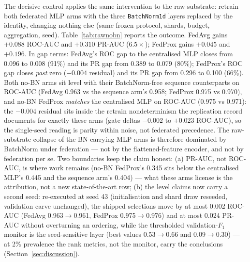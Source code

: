 The decisive control applies the same intervention to the raw
substrate: retrain both federated MLP arms with the three
\texttt{BatchNorm1d} layers replaced by the identity, changing
nothing else (same frozen protocol, shards, budget, aggregation,
seed). Table~\ref{tab:rawnobn} reports the outcome. FedAvg gains
$+0.088$ ROC-AUC and $+0.310$ PR-AUC ($6.5\times$); FedProx gains
$+0.045$ and $+0.196$. In gap terms: FedAvg's ROC gap to the
centralised MLP closes from 0.096 to 0.008 (91\%) and its PR gap
from 0.389 to 0.079 (80\%); FedProx's ROC gap closes \emph{past}
zero ($-0.004$ residual) and its PR gap from 0.296 to 0.100 (66\%).
Both no-BN arms sit level with their BatchNorm-free sequence
counterparts on ROC-AUC (FedAvg 0.963 vs the sequence arm's 0.958;
FedProx 0.975 vs 0.970), and no-BN FedProx \emph{matches} the
centralised MLP on ROC-AUC (0.975 vs 0.971): the $-0.004$ residual
sits inside the retrain nondeterminism the replication record
documents for exactly these arms (gate deltas $-0.002$ to $+0.023$
ROC-AUC), so the single-seed reading is parity within noise, not
federated precedence. The raw-substrate collapse of the BN-carrying
MLP arms is therefore dominated by BatchNorm under federation ---
not by the flattened-feature encoder, and not by federation per se.
Two boundaries keep the claim honest: (a) PR-AUC, not ROC-AUC, is
where work remains (no-BN FedProx's 0.345 sits below the centralised
MLP's 0.445 and the sequence arm's 0.404) --- what these arms
license is the attribution, not a new state-of-the-art row; (b) the
level claims now carry a second seed: re-executed at seed 43
(initialisation and shard draw reseeded, validation carve
unchanged), the shipped selections move by at most 0.002 ROC-AUC
(FedAvg 0.963$\to$0.961, FedProx 0.975$\to$0.976) and at most
0.024 PR-AUC without overturning an ordering, while the thresholded
validation-$F_1$ monitor is the seed-sensitive layer (best values
0.53$\to$0.66 and 0.09$\to$0.30) --- at 2\% prevalence the rank
metrics, not the monitor, carry the conclusions
(Section~\ref{sec:discussion}).

